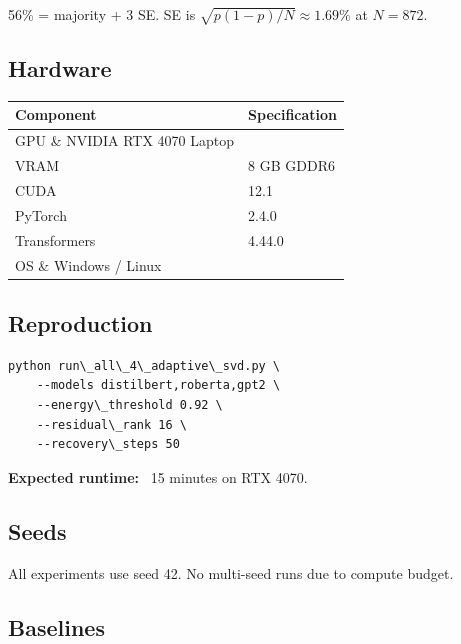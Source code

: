56\% = majority + 3 SE. SE is $\sqrt{p(1-p)/N} \approx 1.69\%$ at $N = 872$.

\subsection{Hardware}

\begin{table}[H]
\centering
\small
\begin{tabular}{ll}
\toprule
\textbf{Component} & \textbf{Specification} \\
\midrule
GPU \& NVIDIA RTX 4070 Laptop \\
VRAM & 8 GB GDDR6 \\
CUDA & 12.1 \\
PyTorch & 2.4.0 \\
Transformers & 4.44.0 \\
OS \& Windows / Linux \\
\bottomrule
\end{tabular}
\end{table}

\subsection{Reproduction}

\begin{lstlisting}
python run\_all\_4\_adaptive\_svd.py \
    --models distilbert,roberta,gpt2 \
    --energy\_threshold 0.92 \
    --residual\_rank 16 \
    --recovery\_steps 50
\end{lstlisting}

\textbf{Expected runtime:} ~15 minutes on RTX 4070.

\subsection{Seeds}

All experiments use seed 42. No multi-seed runs due to compute budget.

\subsection{Baselines}
